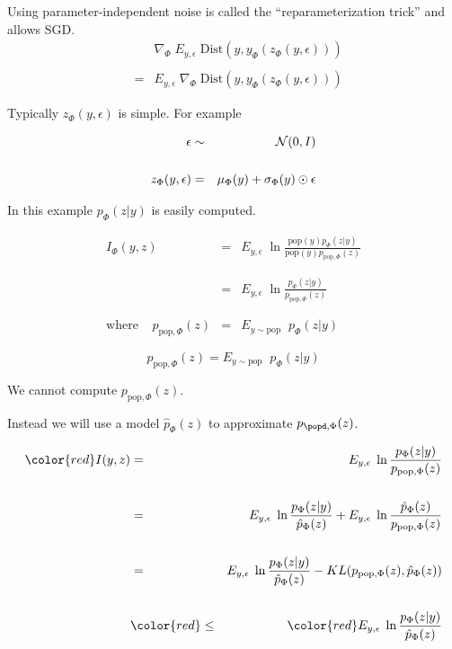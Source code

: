 {\bigskip
Using parameter-independent noise is called the ``reparameterization trick'' and allows SGD.
\begin{eqnarray*}
& & \nabla_\Phi \;E_{y,\epsilon}\; \mathrm{Dist}(y,y_\Phi(z_\Phi(y,\epsilon))) \\
\\
& = & E_{y,\epsilon}\; \nabla_\Phi\;\mathrm{Dist}(y,y_\Phi(z_\Phi(y,\epsilon)))
\end{eqnarray*}


Typically $z_\Phi(y,\epsilon)$ is simple.  For example

\begin{eqnarray*}
\epsilon & \sim & {\cal N}(0,I) \\
\\
z_\Phi(y,\epsilon) & = & \mu_\Phi(y) +\sigma_\Phi(y)\odot \epsilon
\end{eqnarray*}

\vfill
In this example {\color{red} $p_\Phi(z|y)$ is easily computed.}


\begin{eqnarray*}
I_\Phi(y,z)  & = & E_{y,\epsilon}\; \ln \frac{\mathrm{pop}(y)p_\Phi(z|y)}{\mathrm{pop}(y)p_{\mathrm{pop},\Phi}(z)} \\
\\
\\
& = & E_{y,\epsilon}\;\ln \frac{p_\Phi(z|y)}{p_{\mathrm{pop},\Phi}(z)} \\
\\
\\
\mathrm{where}\;\;\;\;p_{\mathrm{pop},\Phi}(z) & = & E_{y\sim \mathrm{pop}}\;\;p_\Phi(z|y)
\end{eqnarray*}


$$p_{\mathrm{pop},\Phi}(z)  = E_{y\sim \mathrm{pop}}\;\;p_\Phi(z|y)$$

\vfill
We cannot compute $p_{\mathrm{pop},\Phi}(z)$.

\vfill
Instead we will use a model $\hat{p}_\Phi(z)$ to approximate $p_{\popd,\Phi}(z)$.


\begin{eqnarray*}
{\color{red} I(y,z)}  & = & E_{y,\epsilon}\;\ln \frac{p_\Phi(z|y)}{p_{\mathrm{pop},\Phi}(z)} \\
\\
& = & E_{y,\epsilon}\;\ln \frac{p_\Phi(z|y)}{\hat{p}_\Phi(z)} + E_{y,\epsilon}\;\ln\frac{\hat{p}_\Phi(z)}{p_{\mathrm{pop},\Phi}(z)} \\
\\
& = & E_{y,\epsilon}\;\ln \frac{p_\Phi(z|y)}{\hat{p}_\Phi(z)} - KL(p_{\mathrm{pop},\Phi}(z),\hat{p}_\Phi(z)) \\
\\
& {\color{red} \leq} & {\color{red} E_{y,\epsilon}\;\ln \frac{p_\Phi(z|y)}{\hat{p}_\Phi(z)}}
\end{eqnarray*}

}
